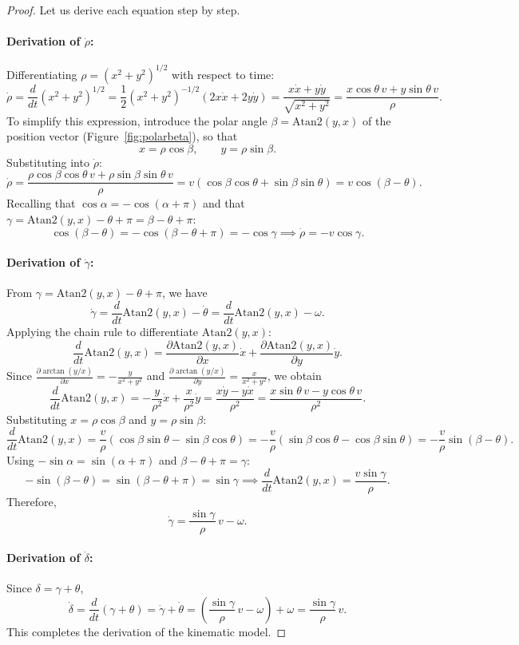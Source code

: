 \documentclass[11pt,a4paper]{article}
\theoremstyle{definition}
\theoremstyle{plain}
\theoremstyle{remark}
\begin{document}
\begin{proof}
Let us derive each equation step by step.

\paragraph{Derivation of $\dot\rho$:}
Differentiating $\rho = (x^2+y^2)^{1/2}$ with respect to time:
\[
\dot\rho = \frac{d}{dt}(x^2+y^2)^{1/2} = \frac{1}{2}(x^2+y^2)^{-1/2}(2x\dot x + 2y\dot y) = \frac{x\dot x + y\dot y}{\sqrt{x^2+y^2}} = \frac{x\cos\theta\,v + y\sin\theta\,v}{\rho}.
\]
To simplify this expression, introduce the polar angle $\beta = \mathrm{Atan2}(y,x)$ of the position vector (Figure~\ref{fig:polarbeta}), so that
\[
x = \rho\cos\beta,\qquad y = \rho\sin\beta .
\]
Substituting into $\dot\rho$:
\[
\dot\rho = \frac{\rho\cos\beta\cos\theta\,v + \rho\sin\beta\sin\theta\,v}{\rho} = v(\cos\beta\cos\theta + \sin\beta\sin\theta) = v\cos(\beta-\theta).
\]
Recalling that $\cos\alpha = -\cos(\alpha+\pi)$ and that $\gamma = \mathrm{Atan2}(y,x)-\theta+\pi = \beta-\theta+\pi$:
\[
\cos(\beta-\theta) = -\cos(\beta-\theta+\pi) = -\cos\gamma \implies \dot\rho = -v\cos\gamma .
\]

\paragraph{Derivation of $\dot\gamma$:}
From $\gamma = \mathrm{Atan2}(y,x)-\theta+\pi$, we have
\[
\dot\gamma = \frac{d}{dt}\mathrm{Atan2}(y,x) - \dot\theta = \frac{d}{dt}\mathrm{Atan2}(y,x) - \omega .
\]
Applying the chain rule to differentiate $\mathrm{Atan2}(y,x)$:
\[
\frac{d}{dt}\mathrm{Atan2}(y,x) = \frac{\partial\mathrm{Atan2}(y,x)}{\partial x}\dot x + \frac{\partial\mathrm{Atan2}(y,x)}{\partial y}\dot y .
\]
Since $\frac{\partial\arctan(y/x)}{\partial x} = -\frac{y}{x^2+y^2}$ and $\frac{\partial\arctan(y/x)}{\partial y} = \frac{x}{x^2+y^2}$, we obtain
\[
\frac{d}{dt}\mathrm{Atan2}(y,x) = -\frac{y}{\rho^2}\dot x + \frac{x}{\rho^2}\dot y = \frac{x\dot y - y\dot x}{\rho^2} = \frac{x\sin\theta\,v - y\cos\theta\,v}{\rho^2}.
\]
Substituting $x = \rho\cos\beta$ and $y = \rho\sin\beta$:
\[
\frac{d}{dt}\mathrm{Atan2}(y,x) = \frac{v}{\rho}(\cos\beta\sin\theta - \sin\beta\cos\theta) = -\frac{v}{\rho}(\sin\beta\cos\theta - \cos\beta\sin\theta) = -\frac{v}{\rho}\sin(\beta-\theta).
\]
Using $-\sin\alpha = \sin(\alpha+\pi)$ and $\beta-\theta+\pi = \gamma$:
\[
-\sin(\beta-\theta) = \sin(\beta-\theta+\pi) = \sin\gamma \implies \frac{d}{dt}\mathrm{Atan2}(y,x) = \frac{v\sin\gamma}{\rho}.
\]
Therefore,
\[
\dot\gamma = \frac{\sin\gamma}{\rho}\,v - \omega .
\]

\paragraph{Derivation of $\dot\delta$:}
Since $\delta = \gamma+\theta$,
\[
\dot\delta = \frac{d}{dt}(\gamma+\theta) = \dot\gamma + \dot\theta = \left(\frac{\sin\gamma}{\rho}\,v - \omega\right) + \omega = \frac{\sin\gamma}{\rho}\,v .
\]
This completes the derivation of the kinematic model.
\end{proof}
\end{document}
